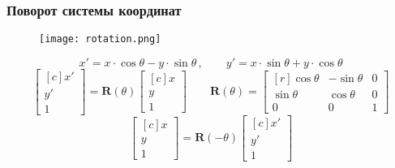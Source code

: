 \documentclass[
    12pt, 
    usepdftitle=false,
    aspectratio=1610
]{beamer}
\begin{document}
\begin{frame}
    \frametitle{Поворот системы координат}
    \begin{figure}[t]
        \texttt{[image: rotation.png]}
    \end{figure}
    $$
        x' = x\cdot\cos\theta - y\cdot\sin\theta\,,\qquad
        y' = x\cdot\sin\theta + y\cdot\cos\theta
    $$
    $$
        \begin{bmatrix*}[c]
            x' \\ y' \\ 1    
        \end{bmatrix*}=
        \mathbf{R}(\theta)
        \begin{bmatrix*}[c]
            x \\ y \\ 1    
        \end{bmatrix*}
        \qquad
        \mathbf{R}(\theta)=
        \begin{bmatrix*}[r]
            \cos\theta & -\sin\theta & 0 \\
            \sin\theta & \cos\theta & 0 \\
            0 & 0 & 1
        \end{bmatrix*}
    $$
    $$
        \begin{bmatrix*}[c]
            x \\ y \\ 1    
        \end{bmatrix*}=
        \mathbf{R}(-\theta)
        \begin{bmatrix*}[c]
            x' \\ y' \\ 1    
        \end{bmatrix*}
    $$
\end{frame}
\end{document}
